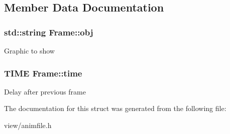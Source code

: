 \subsection{Member Data Documentation}
\hypertarget{struct_frame_a3c5a61f86f241b86dd1667ea2324570a}{
\subsubsection[{obj}]{\setlength{\rightskip}{0pt plus 5cm}std\-::string Frame\-::obj}}\label{struct_frame_a3c5a61f86f241b86dd1667ea2324570a}
Graphic to show \hypertarget{struct_frame_a7a0a8d19dd75bd37ef824bfda1c5b50f}{
\subsubsection[{time}]{\setlength{\rightskip}{0pt plus 5cm}T\-I\-M\-E Frame\-::time}}\label{struct_frame_a7a0a8d19dd75bd37ef824bfda1c5b50f}
Delay after previous frame 

The documentation for this struct was generated from the following file\-:\begin{DoxyCompactItemize}
\item 
view/animfile.\-h\end{DoxyCompactItemize}
